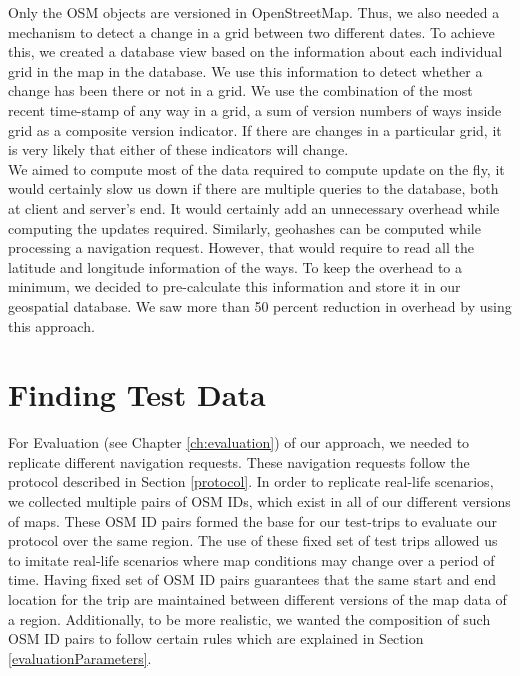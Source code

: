Only the OSM objects are versioned in OpenStreetMap. Thus, we also needed a mechanism to detect a change in a grid between two different dates. To achieve this, we created a database view based on the information about each individual grid in the map in the database. We use this information to detect whether a change has been there or not in a grid. We use the combination of the most recent time-stamp of any way in a grid, a sum of version numbers of ways inside grid as a composite version indicator. If there are changes in a particular grid, it is very likely that either of these indicators will change.
\\

We aimed to compute most of the data required to compute update on the fly, it would certainly slow us down if there are multiple queries to the database, both at client and server's end. It would certainly add an unnecessary overhead while computing the updates required. Similarly, geohashes can be computed while processing a navigation request. However, that would require to read all the latitude and longitude information of the ways. To keep the overhead to a minimum, we decided to pre-calculate this information and store it in our geospatial database. We saw more than 50 percent reduction in overhead by using this approach. 








\section{Finding Test Data}
For Evaluation (see Chapter \ref{ch:evaluation}) of our approach, we needed to replicate different navigation requests. These navigation requests follow the protocol described in Section \ref{protocol}. In order to replicate real-life scenarios, we collected multiple pairs of OSM IDs, which exist in all of our different versions of maps. These OSM ID pairs formed the base for our test-trips to evaluate our protocol over the same region. The use of these fixed set of test trips allowed us to imitate real-life scenarios where map conditions may change over a period of time. Having fixed set of OSM ID pairs guarantees that the same start and end location for the trip are maintained between different versions of the map data of a region. Additionally, to be more realistic, we wanted the composition of such OSM ID pairs to follow certain rules which are explained in Section \ref{evaluationParameters}.  
